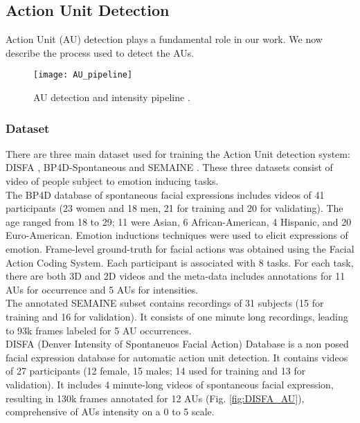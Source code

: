 \subsection{Action Unit Detection}
Action Unit (AU) detection plays a fundamental role in our work. We now describe the process used to detect the AUs.

\begin{figure}[H]
	\centering
	\texttt{[image: AU\_pipeline]}
	\caption{AU detection and intensity pipeline \cite{Baltru2015}.}
	\label{fig:AU_pipeline}
\end{figure}

\subsubsection{Dataset}
There are three main dataset used for training the Action Unit detection system:  DISFA \cite{DISFA}, BP4D-Spontaneous \cite{BP4D-Spontaneous} and SEMAINE \cite{SEMAINE}. These three datasets consist of video of people subject to emotion inducing tasks.\\

The BP4D database of spontaneous facial expressions includes videos of 41 participants (23 women and 18 men, 21 for training and 20 for validating). The age ranged from 18 to 29; 11 were Asian, 6 African-American, 4 Hispanic, and 20 Euro-American. Emotion inductions techniques were used to elicit expressions of emotion. Frame-level ground-truth for facial actions was obtained using the Facial Action Coding System. Each participant is associated with 8 tasks. For each task, there are both 3D and 2D videos and the meta-data includes annotations for 11 AUs for occurrence and 5 AUs for intensities.\\

The annotated SEMAINE subset contains recordings of 31 subjects (15 for training and 16 for validation). It consists of one minute long recordings, leading to 93k frames labeled for 5 AU occurrences.\\

DISFA (Denver Intensity of Spontaneuos Facial Action) Database is a non posed facial expression database for automatic action unit detection. It contains videos of 27 participants (12 female, 15 males; 14 used for training and 13 for validation). It includes 4 minute-long videos of spontaneous facial expression, resulting in 130k frames annotated for 12 AUs (Fig. \ref{fig:DISFA_AU}), comprehensive of AUs intensity on a 0 to 5 scale.\\

